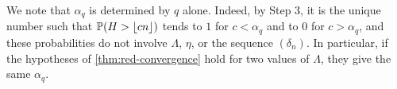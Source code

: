 We note that $\alpha_q$ is determined by $q$ alone. Indeed, by Step 3, it is the unique number such that $\mathbb P(H > \lfloor cn \rfloor)$ tends to $1$ for $c < \alpha_q$ and to $0$ for $c > \alpha_q$, and these probabilities do not involve $\Lambda$, $\eta$, or the sequence $(\delta_n)$. In particular, if the hypotheses of \cref{thm:red-convergence} hold for two values of $\Lambda$, they give the same $\alpha_q$.
